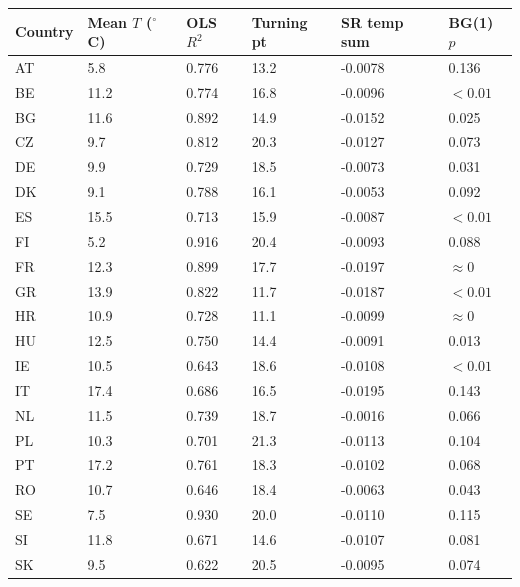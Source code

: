 
\begin{tabular}{llllll}
\toprule
Country & Mean $T$ ($^\circ$C) & OLS $R^2$ & Turning pt & SR temp sum & BG(1) $p$\\
\midrule
AT & 5.8 & 0.776 & 13.2 & -0.0078 & 0.136\\
BE & 11.2 & 0.774 & 16.8 & -0.0096 & $<0.01$\\
BG & 11.6 & 0.892 & 14.9 & -0.0152 & 0.025\\
CZ & 9.7 & 0.812 & 20.3 & -0.0127 & 0.073\\
DE & 9.9 & 0.729 & 18.5 & -0.0073 & 0.031\\
DK & 9.1 & 0.788 & 16.1 & -0.0053 & 0.092\\
ES & 15.5 & 0.713 & 15.9 & -0.0087 & $<0.01$\\
FI & 5.2 & 0.916 & 20.4 & -0.0093 & 0.088\\
FR & 12.3 & 0.899 & 17.7 & -0.0197 & $\approx 0$\\
GR & 13.9 & 0.822 & 11.7 & -0.0187 & $<0.01$\\
HR & 10.9 & 0.728 & 11.1 & -0.0099 & $\approx 0$\\
HU & 12.5 & 0.750 & 14.4 & -0.0091 & 0.013\\
IE & 10.5 & 0.643 & 18.6 & -0.0108 & $<0.01$\\
IT & 17.4 & 0.686 & 16.5 & -0.0195 & 0.143\\
NL & 11.5 & 0.739 & 18.7 & -0.0016 & 0.066\\
PL & 10.3 & 0.701 & 21.3 & -0.0113 & 0.104\\
PT & 17.2 & 0.761 & 18.3 & -0.0102 & 0.068\\
RO & 10.7 & 0.646 & 18.4 & -0.0063 & 0.043\\
SE & 7.5 & 0.930 & 20.0 & -0.0110 & 0.115\\
SI & 11.8 & 0.671 & 14.6 & -0.0107 & 0.081\\
SK & 9.5 & 0.622 & 20.5 & -0.0095 & 0.074\\
\bottomrule
\end{tabular}
